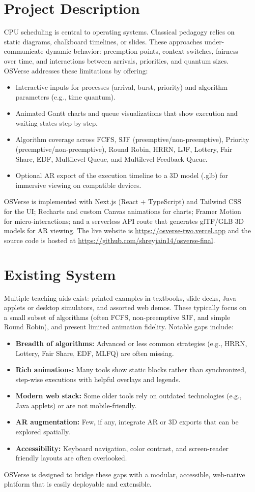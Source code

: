 \documentclass[12pt,a4paper,oneside]{report}
\newcommand{\githubURL}{https://github.com/shreyjain14/osverse-final}
\newcommand{\projectURL}{https://osverse-two.vercel.app}
\begin{document}
\section{Project Description}
CPU scheduling is central to operating systems. Classical pedagogy relies on static diagrams, chalkboard timelines, or slides. These approaches under-communicate dynamic behavior: preemption points, context switches, fairness over time, and interactions between arrivals, priorities, and quantum sizes. OSVerse addresses these limitations by offering:
\begin{itemize}
  \item Interactive inputs for processes (arrival, burst, priority) and algorithm parameters (e.g., time quantum).
  \item Animated Gantt charts and queue visualizations that show execution and waiting states step-by-step.
  \item Algorithm coverage across FCFS, SJF (preemptive/non-preemptive), Priority (preemptive/non-preemptive), Round Robin, HRRN, LJF, Lottery, Fair Share, EDF, Multilevel Queue, and Multilevel Feedback Queue.
  \item Optional AR export of the execution timeline to a 3D model (.glb) for immersive viewing on compatible devices.
\end{itemize}
OSVerse is implemented with Next.js (React + TypeScript) and Tailwind CSS for the UI; Recharts and custom Canvas animations for charts; Framer Motion for micro-interactions; and a serverless API route that generates glTF/GLB 3D models for AR viewing. The live website is \href{\projectURL}{\projectURL} and the source code is hosted at \href{\githubURL}{\githubURL}.

\section{Existing System}
Multiple teaching aids exist: printed examples in textbooks, slide decks, Java applets or desktop simulators, and assorted web demos. These typically focus on a small subset of algorithms (often FCFS, non-preemptive SJF, and simple Round Robin), and present limited animation fidelity. Notable gaps include:
\begin{itemize}
  \item \textbf{Breadth of algorithms:} Advanced or less common strategies (e.g., HRRN, Lottery, Fair Share, EDF, MLFQ) are often missing.
  \item \textbf{Rich animations:} Many tools show static blocks rather than synchronized, step-wise executions with helpful overlays and legends.
  \item \textbf{Modern web stack:} Some older tools rely on outdated technologies (e.g., Java applets) or are not mobile-friendly.
  \item \textbf{AR augmentation:} Few, if any, integrate AR or 3D exports that can be explored spatially.
  \item \textbf{Accessibility:} Keyboard navigation, color contrast, and screen-reader friendly layouts are often overlooked.
\end{itemize}
OSVerse is designed to bridge these gaps with a modular, accessible, web-native platform that is easily deployable and extensible.
\end{document}
